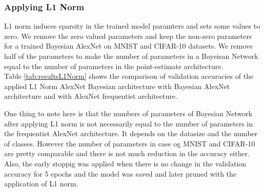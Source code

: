 \subsubsection{Applying L1 Norm}


L1 norm induces sparsity in the trained model paramters and sets some values to zero. We remove the zero valued parameters and keep the non-zero parameters for a trained Bayesian AlexNet on MNIST and CIFAR-10 datasets. We remove half of the parameters to make the number of parameters in a Bayeisan Network equal to the number of parameters in the point-estimate architecture. \\ Table \ref{tab:resultsL1Norm} shows the comparison of validation accuracies of the applied L1 Norm AlexNet Bayesian architecture with Bayesian AlexNet architecture and with AlexNet frequentist architecture. 

\begin{table}[H]
\tiny
    \centering
    \renewcommand{\arraystretch}{1.5}
    \renewcommand{\arraystretch}{1.5}
    \caption{Comparison of validation accuracies (in percentage) for AlexNet with variational inference (VI), AlexNet with frequentist inference and BayesianAlexNet with L1 norm applied for MNIST and CIFAR-10 datasets.}
    \label{tab:resultsL1Norm}
\end{table}

One thing to note here is that the numbers of parameters of Bayesian Network after applying L1 norm is not necessarily equal to the number of parameters in the frequentist AlexNet architecture. It depends on the datasize and the number of classes. However the number of parameters in case og MNIST and CIFAR-10 are pretty comparable and there is not much reduction in the accuracy either. Also, the early stoppig was applied when there is no change in the validation accuracy for 5 epochs and the model was saved and later pruned with the application of L1 norm.

